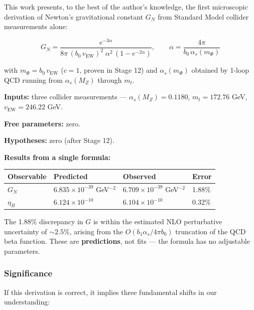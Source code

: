 \documentclass[
  11pt,
]{article}
\begin{document}
This work presents, to the best of the author's knowledge, the first
microscopic derivation of Newton's gravitational constant \(G_N\) from
Standard Model collider measurements alone:

\[G_N = \frac{e^{-3\alpha}}{8\pi\,(b_0\,v_{\text{EW}})^2\;\alpha^2\,(1 - e^{-2\alpha})}, \qquad \alpha = \frac{4\pi}{b_0\,\alpha_s(m_\Phi)} \tag{268}\]

with \(m_\Phi = b_0\,v_{\text{EW}}\) (\(c = 1\), proven in Stage 12) and
\(\alpha_s(m_\Phi)\) obtained by 1-loop QCD running from
\(\alpha_s(M_Z)\) through \(m_t\).

\textbf{Inputs:} three collider measurements ---
\(\alpha_s(M_Z) = 0.1180\), \(m_t = 172.76\) GeV,
\(v_{\text{EW}} = 246.22\) GeV.

\textbf{Free parameters:} zero.

\textbf{Hypotheses:} zero (after Stage 12).

\textbf{Results from a single formula:}

\begin{longtable}[]{@{}llll@{}}
\toprule
Observable & Predicted & Observed & Error\tabularnewline
\midrule
\endhead
\(G_N\) & \(6.835 \times 10^{-39}\) GeV\(^{-2}\) &
\(6.709 \times 10^{-39}\) GeV\(^{-2}\) & 1.88\%\tabularnewline
\(\eta_B\) & \(6.124 \times 10^{-10}\) & \(6.104 \times 10^{-10}\) &
0.32\%\tabularnewline
\bottomrule
\end{longtable}

The 1.88\% discrepancy in \(G\) is within the estimated NLO perturbative
uncertainty of \(\sim 2.5\%\), arising from the
\(O(b_1 \alpha_s / 4\pi b_0)\) truncation of the QCD beta function.
These are \textbf{predictions}, not fits --- the formula has no
adjustable parameters.

\hypertarget{significance}{%
\subsubsection{Significance}\label{significance}}

If this derivation is correct, it implies three fundamental shifts in
our understanding:
\end{document}
